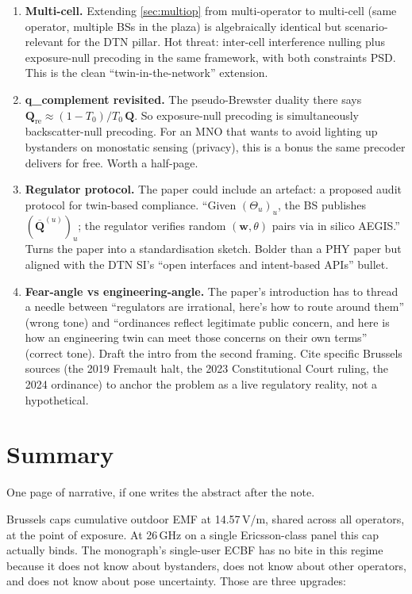 \documentclass[11pt,a4paper]{article}
\theoremstyle{definition}
\newcommand{\ww}{\mathbf{w}}
\newcommand{\Q}{\mathbf{Q}}
\newcommand{\Qbar}{\overline{\mathbf{Q}}}
\newcommand{\Poses}{\Theta}
\begin{document}
\begin{enumerate}[leftmargin=1.6em,itemsep=3pt]
\item \textbf{Multi-cell.} Extending \cref{sec:multiop} from
multi-operator to multi-cell (same operator, multiple BSs in the
plaza) is algebraically identical but scenario-relevant for the DTN
pillar. Hot threat: inter-cell interference nulling plus
exposure-null precoding in the same framework, with both constraints
PSD. This is the clean ``twin-in-the-network'' extension.

\item \textbf{q\_complement revisited.} The pseudo-Brewster duality
there says $\Q_{\mathrm{re}}\approx (1-T_0)/T_0\,\Q$. So
exposure-null precoding is simultaneously
backscatter-null precoding. For an MNO that wants to avoid lighting
up bystanders on monostatic sensing (privacy), this is a bonus the
same precoder delivers for free. Worth a half-page.

\item \textbf{Regulator protocol.} The paper could include an
artefact: a proposed audit protocol for twin-based compliance.
``Given $(\Poses_u)_u$, the BS publishes $(\Qbar^{(u)})_u$; the
regulator verifies random
$(\ww,\theta)$ pairs via in silico AEGIS.'' Turns the paper into a
standardisation sketch. Bolder than a PHY paper but aligned with the
DTN SI's ``open interfaces and intent-based APIs'' bullet.

\item \textbf{Fear-angle vs engineering-angle.} The paper's
introduction has to thread a needle between ``regulators are
irrational, here's how to route around them'' (wrong tone) and
``ordinances reflect legitimate public concern, and here is how an
engineering twin can meet those concerns on their own terms''
(correct tone). Draft the intro from the second framing. Cite
specific Brussels sources (the 2019 Fremault halt, the 2023
Constitutional Court ruling, the 2024 ordinance) to anchor the
problem as a live regulatory reality, not a hypothetical.

\end{enumerate}

\section{Summary}

One page of narrative, if one writes the abstract after the note.

Brussels caps cumulative outdoor EMF at 14.57\,V/m, shared across all
operators, at the point of exposure. At 26\,GHz on a single
Ericsson-class panel this cap actually binds. The monograph's
single-user ECBF has no bite in this regime because it does not know
about bystanders, does not know about other operators, and does not
know about pose uncertainty. Those are three upgrades:
\end{document}
